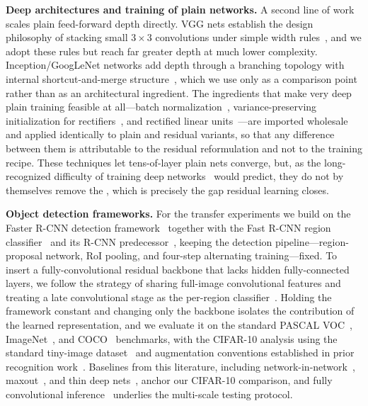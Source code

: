 \noindent\textbf{Deep architectures and training of plain networks.}
A second line of work scales plain feed-forward depth directly. VGG nets establish the
design philosophy of stacking small $3\times3$ convolutions under simple width
rules~\citep{simonyan2015vgg}, and we adopt these rules but reach far greater depth at
much lower complexity. Inception/GoogLeNet networks add depth through a branching
topology with internal shortcut-and-merge structure~\citep{szegedy2015googlenet}, which
we use only as a comparison point rather than as an architectural ingredient. The
ingredients that make very deep plain training feasible at all---batch
normalization~\citep{ioffe2015batchnorm}, variance-preserving initialization for
rectifiers~\citep{he2015prelu,glorot2010xavier}, and rectified linear
units~\citep{nair2010relu}---are imported wholesale and applied identically to plain and
residual variants, so that any difference between them is attributable to the residual
reformulation and not to the training recipe. These techniques let tens-of-layer plain
nets converge, but, as the long-recognized difficulty of training deep
networks~\citep{bengio1994longterm} would predict, they do not by themselves remove the
\degprob, which is precisely the gap residual learning closes.

\noindent\textbf{Object detection frameworks.}
For the transfer experiments we build on the Faster R-CNN detection
framework~\citep{ren2015fasterrcnn} together with the Fast R-CNN region
classifier~\citep{girshick2015fastrcnn} and its R-CNN predecessor~\citep{girshick2014rcnn},
keeping the detection pipeline---region-proposal network, RoI pooling, and four-step
alternating training---fixed. To insert a fully-convolutional residual backbone that
lacks hidden fully-connected layers, we follow the strategy of sharing full-image
convolutional features and treating a late convolutional stage as the per-region
classifier~\citep{ren2015noc}. Holding the framework constant and changing only the
backbone isolates the contribution of the learned representation, and we evaluate it on
the standard PASCAL VOC~\citep{everingham2010pascalvoc}, ImageNet~\citep{russakovsky2015imagenet},
and COCO~\citep{lin2014coco} benchmarks, with the CIFAR-10 analysis using the standard
tiny-image dataset~\citep{krizhevsky2009cifar} and augmentation conventions established
in prior recognition work~\citep{krizhevsky2012alexnet}. Baselines from this literature,
including network-in-network~\citep{lin2013nin}, maxout~\citep{goodfellow2013maxout}, and
thin deep nets~\citep{romero2015fitnets}, anchor our CIFAR-10 comparison, and fully
convolutional inference~\citep{long2015fcn} underlies the multi-scale testing protocol.
